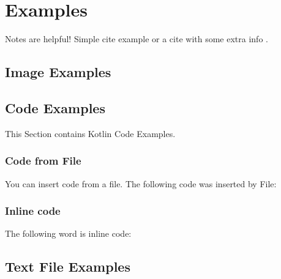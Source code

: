 \chapter{Examples}
\label{chap:examples}

Notes are helpful!  Simple cite example \cite{github} or a cite with some extra info \cite[S. 1]{github}.

\section{Image Examples}

\section{Code Examples}
This Section contains Kotlin Code Examples. 

\subsection{Code from File}
You can insert code from a file. The following code was inserted by File:

\subsection{Inline code}
The following word is inline code: 

\section{Text File Examples}
